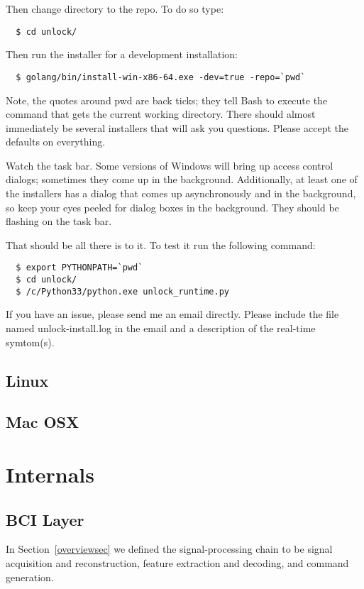 \documentclass[11pt]{article}
\begin{document}
Then change directory to the repo.  To do so type:
\begin{verbatim}
  $ cd unlock/
\end{verbatim}

Then run the installer for a development installation:
\begin{verbatim}
  $ golang/bin/install-win-x86-64.exe -dev=true -repo=`pwd`
\end{verbatim}

Note, the quotes around pwd are back ticks; they tell Bash to execute the command that gets the current working directory.  There should almost immediately be several installers that will ask you questions.  Please accept the defaults on everything.  

Watch the task bar.  Some versions of Windows will bring up access control dialogs; sometimes they come up in the background.  Additionally, at least one of the installers has a dialog that comes up asynchronously and in the background, so keep your eyes peeled for dialog boxes in the background.  They should be flashing on the task bar.

That should be all there is to it.  To test it run the following command:

\begin{verbatim}
  $ export PYTHONPATH=`pwd`
  $ cd unlock/
  $ /c/Python33/python.exe unlock_runtime.py
\end{verbatim} 

If you have an issue, please send me an email directly.  Please include the file named unlock-install.log in the email and a description of the real-time symtom(s).  
 
\subsection{Linux}
\subsection{Mac OSX}
\section{Internals}
\subsection{BCI Layer}\label{bcisec}

In Section~\ref{overviewsec} we defined the signal-processing chain to be signal acquisition and reconstruction, feature extraction and decoding, and command generation.
\end{document}
